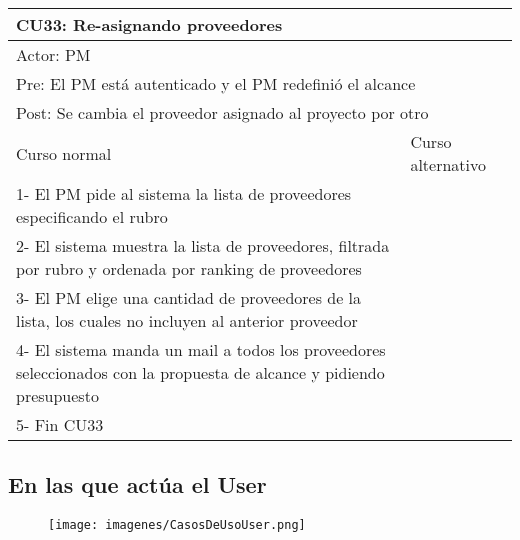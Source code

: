 \begin{table}[H]
  \begin{adjustbox}{max width = \textwidth}
  \begin{tabular}{|l|l|}
    \hline
    \multicolumn{2}{|l|}{CU33: Re-asignando proveedores} \\\hline
    \multicolumn{2}{|l|}{Actor: PM} \\\hline
    \multicolumn{2}{|l|}{Pre: El PM está autenticado y el PM redefinió el alcance} \\\hline
    \multicolumn{2}{|l|}{Post: Se cambia el proveedor asignado al proyecto por otro} \\\hline
     Curso normal & Curso alternativo\\ \hline
     1- El PM pide al sistema la lista de proveedores especificando el rubro & \\ \hline
     2- El sistema muestra la lista de proveedores, filtrada por rubro y ordenada por ranking de proveedores & \\ \hline
     3- El PM elige una cantidad de proveedores de la lista, los cuales no incluyen al anterior proveedor& \\ \hline
     4- El sistema manda un mail a todos los proveedores seleccionados con la propuesta de alcance y pidiendo presupuesto & \\ \hline
     5- Fin CU33 & \\ \hline
  \end{tabular}
  \end{adjustbox}
\end{table}

\subsection{En las que actúa el User}

\begin{figure}[H]
    \texttt{[image: imagenes/CasosDeUsoUser.png]}
\end{figure}

